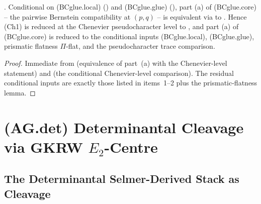 \begin{corollary}
\label{v4-arith:w5-h:cor:ch1-closes-pairwise}
\ClaimStatusProvedHereConditional. Conditional on (BCglue.local)
() and (BCglue.glue)
(), part (a) of
(BCglue.core) -- the pairwise Bernstein compatibility at \((p,q)\) --
is equivalent via
 to
. Hence (Ch1) is reduced
at the Chenevier pseudocharacter level to
, and
part (a) of (BCglue.core) is reduced to the conditional inputs
(BCglue.local), (BCglue.glue), prismatic flatness \(\Pi\)-flat, and
the pseudocharacter trace comparison.
\end{corollary}

\begin{proof}
Immediate from
(equivalence of part~(a) with the Chenevier-level statement) and
 (the conditional Chenevier-level
comparison). The residual conditional inputs are
exactly those listed in
 items~1--2 plus
the prismatic-flatness lemma.
\end{proof}

\section{(AG.det) Determinantal Cleavage via GKRW \(E_{2}\)-Centre}
\label{v4-arith:w5-h:agdet}

\subsection{The Determinantal Selmer-Derived Stack as Cleavage}

